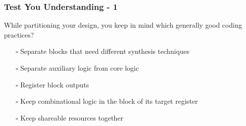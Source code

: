 \documentclass[t, notes, xcolor=table]{beamer}
\begin{document}
\begin{frame}
\frametitle{Test You Understanding - 1}
While partitioning your design, you keep in mind which generally good coding practices?
\begin{itemize}
\item[$\square$] Separate blocks that need different synthesis techniques
\item[$\square$] Separate auxiliary logic from core logic
\item[$\square$] Register block outputs
\item[$\square$] Keep combinational logic in the block of its target register
\item[$\square$] Keep shareable resources together
\end{itemize}
\end{frame}
\end{document}
